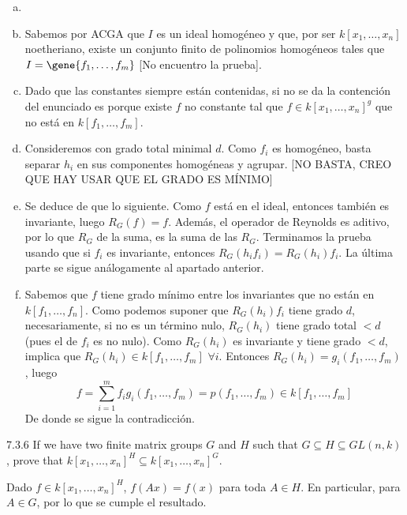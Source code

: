 \documentclass[twoside]{article}
\begin{document}
\begin{solucion}
\begin{enumerate}[a.]
\item[]
\item Sabemos por ACGA que $I$ es un ideal homogéneo y que, por ser $k[x_1,\dotsc,x_n]$ noetheriano, existe un conjunto finito de polinomios homogéneos tales que $I=\gene{f_1,\dotsc,f_m}$ [No encuentro la prueba].
\item Dado que las constantes siempre están contenidas, si no se da la contención del enunciado es porque existe $f$ no constante tal que $f\in k[x_1,\dotsc,x_n]^g$ que no está en $k[f_1,\dotsc,f_m]$.
\item Consideremos con grado total minimal $d$. Como $f_i$ es homogéneo, basta separar $h_i$ en sus componentes homogéneas y agrupar. [NO BASTA, CREO QUE HAY USAR QUE EL GRADO ES MÍNIMO]
\item Se deduce de que lo siguiente. Como $f$ está en el ideal, entonces también es invariante, luego $R_G(f)=f$. Además, el operador de Reynolds es aditivo, por lo que $R_G$ de la suma, es la suma de las $R_G$. Terminamos la prueba usando que si $f_i$ es invariante, entonces $R_G(h_if_i)=R_G(h_i)f_i$. La última parte se sigue análogamente al apartado anterior.
\item Sabemos que $f$ tiene grado mínimo entre los invariantes que no están en $k[f_1,\dotsc,f_n]$. Como podemos suponer que $R_G(h_i)f_i$ tiene grado $d$, necesariamente, si no es un término nulo, $R_G(h_i)$ tiene grado total $<d$ (pues el de $f_i$ es no nulo). Como $R_G(h_i)$ es invariante y tiene grado $<d$, implica que $R_G(h_i)\in k[f_1,\dotsc,f_m]$ $\forall i$. Entonces $R_G(h_i) = g_i(f_1,\dotsc,f_m)$, luego
$$
f = \sum_{i=1}^m f_i g_i(f_1,\dotsc,f_m) = p(f_1,\dotsc,f_m) \in k[f_1,\dotsc,f_m]
$$
De donde se sigue la contradicción.
\end{enumerate}
\end{solucion}
\newpage

\begin{ejercicio}{7.3.6}
If we have two finite matrix groups $G$ and $H$ such that $G ⊆ H ⊆ GL(n, k)$, prove that
$k[x_1, \dots , x_n]^H ⊆ k[x_1, \dots , x_n]^G$.
\end{ejercicio}
\begin{solucion}
Dado $f\in k[x_1, \dots , x_n]^H$, $f(Ax)=f(x)$ para toda $A\in H$. En particular, para $A\in G$, por lo que se cumple el resultado.
\end{solucion}
\newpage
\end{document}

